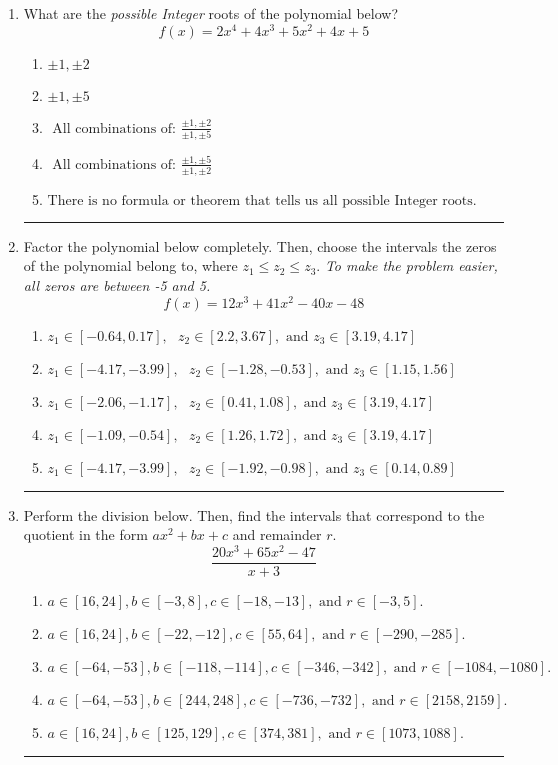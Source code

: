 \documentclass[14pt]{extbook}
\newcommand{\litem}[1]{\item#1\hspace*{-1cm}\rule{\textwidth}{0.4pt}}
\begin{document}
\begin{enumerate}
{\begin{enumerate}[label=\Alph*.]
\end{enumerate} }
\litem{
What are the \textit{possible Integer} roots of the polynomial below?\[ f(x) = 2x^{4} +4 x^{3} +5 x^{2} +4 x + 5 \]\begin{enumerate}[label=\Alph*.]
\item \( \pm 1,\pm 2 \)
\item \( \pm 1,\pm 5 \)
\item \( \text{ All combinations of: }\frac{\pm 1,\pm 2}{\pm 1,\pm 5} \)
\item \( \text{ All combinations of: }\frac{\pm 1,\pm 5}{\pm 1,\pm 2} \)
\item \( \text{There is no formula or theorem that tells us all possible Integer roots.} \)

\end{enumerate} }
\litem{
Factor the polynomial below completely. Then, choose the intervals the zeros of the polynomial belong to, where $z_1 \leq z_2 \leq z_3$. \textit{To make the problem easier, all zeros are between -5 and 5.}\[ f(x) = 12x^{3} +41 x^{2} -40 x -48 \]\begin{enumerate}[label=\Alph*.]
\item \( z_1 \in [-0.64, 0.17], \text{   }  z_2 \in [2.2, 3.67], \text{   and   } z_3 \in [3.19, 4.17] \)
\item \( z_1 \in [-4.17, -3.99], \text{   }  z_2 \in [-1.28, -0.53], \text{   and   } z_3 \in [1.15, 1.56] \)
\item \( z_1 \in [-2.06, -1.17], \text{   }  z_2 \in [0.41, 1.08], \text{   and   } z_3 \in [3.19, 4.17] \)
\item \( z_1 \in [-1.09, -0.54], \text{   }  z_2 \in [1.26, 1.72], \text{   and   } z_3 \in [3.19, 4.17] \)
\item \( z_1 \in [-4.17, -3.99], \text{   }  z_2 \in [-1.92, -0.98], \text{   and   } z_3 \in [0.14, 0.89] \)

\end{enumerate} }
\litem{
Perform the division below. Then, find the intervals that correspond to the quotient in the form $ax^2+bx+c$ and remainder $r$.\[ \frac{20x^{3} +65 x^{2} -47}{x + 3} \]\begin{enumerate}[label=\Alph*.]
\item \( a \in [16, 24], b \in [-3, 8], c \in [-18, -13], \text{ and } r \in [-3, 5]. \)
\item \( a \in [16, 24], b \in [-22, -12], c \in [55, 64], \text{ and } r \in [-290, -285]. \)
\item \( a \in [-64, -53], b \in [-118, -114], c \in [-346, -342], \text{ and } r \in [-1084, -1080]. \)
\item \( a \in [-64, -53], b \in [244, 248], c \in [-736, -732], \text{ and } r \in [2158, 2159]. \)
\item \( a \in [16, 24], b \in [125, 129], c \in [374, 381], \text{ and } r \in [1073, 1088]. \)


\end{enumerate}}
\end{enumerate}
\end{document}

